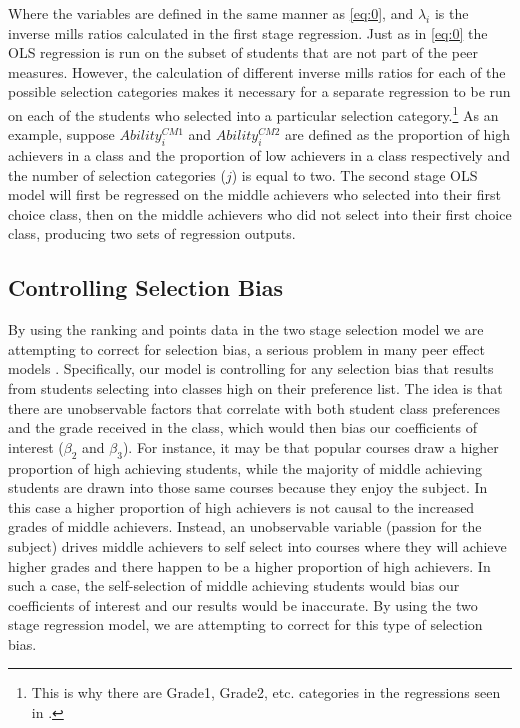 Where the variables are defined in the same manner as \eqref{eq:0}, and $\lambda_{i}$ is the inverse mills ratios calculated in the first stage regression.
Just as in \eqref{eq:0} the OLS regression is run on the subset of students that are not part of the peer measures. 
However, the calculation of different inverse mills ratios for each of the possible selection categories makes it necessary for a separate regression to be run on each of the students who selected into a particular selection category.\footnote{This is why there are Grade1, Grade2, etc. categories in the regressions seen in .}
As an example, suppose $Ability_{i}^{CM1}$ and $Ability_{i}^{CM2}$ are defined as the proportion of high achievers in a class and the proportion of low achievers in a class respectively and the number of selection categories ($j$) is equal to two. 
The second stage OLS model will first be regressed on the middle achievers who selected into their first choice class, then on the middle achievers who did not select into their first choice class, producing two sets of regression outputs. 

\subsection{Controlling Selection Bias}\label{methods:csb}

By using the ranking and points data in the two stage selection model we are attempting to correct for selection bias, a serious problem in many peer effect models \citep{carman2012classroom,burke2013classroom,ding2007peers}. 
Specifically, our model is controlling for any selection bias that results from students selecting into classes high on their preference list. 
The idea is that there are unobservable factors that correlate with both student class preferences and the grade received in the class, which would then bias our coefficients of interest ($\beta_{2}$ and $\beta_{3}$). 
For instance, it may be that popular courses draw a higher proportion of high achieving students, while the majority of middle achieving students are drawn into those same courses because they enjoy the subject. 
In this case a higher proportion of high achievers is not causal to the increased grades of middle achievers. 
Instead, an unobservable variable (passion for the subject) drives middle achievers to self select into courses where they will achieve higher grades and there happen to be a higher proportion of high achievers. 
In such a case, the self-selection of middle achieving students would bias our coefficients of interest and our results would be inaccurate.
By using the two stage regression model, we are attempting to correct for this type of selection bias.

